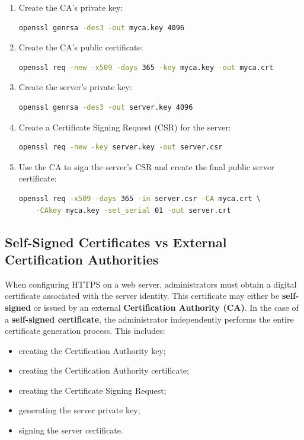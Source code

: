 \documentclass{scrbook}
\begin{document}
	\begin{enumerate}
		\item Create the CA's private key:
		\begin{lstlisting}[language=bash]
openssl genrsa -des3 -out myca.key 4096
		\end{lstlisting}
		
		\item Create the CA's public certificate:
		\begin{lstlisting}[language=bash]
openssl req -new -x509 -days 365 -key myca.key -out myca.crt
		\end{lstlisting}
		
		\item Create the server's private key:
		\begin{lstlisting}[language=bash]
openssl genrsa -des3 -out server.key 4096
		\end{lstlisting}
		
		\item Create a Certificate Signing Request (CSR) for the server:
		\begin{lstlisting}[language=bash]
openssl req -new -key server.key -out server.csr
		\end{lstlisting}
		
		\item Use the CA to sign the server's CSR and create the final public server certificate:
		\begin{lstlisting}[language=bash]
openssl req -x509 -days 365 -in server.csr -CA myca.crt \
	-CAkey myca.key -set_serial 01 -out server.crt
		\end{lstlisting}
	\end{enumerate}
	
	\newpage
	\subsection{Self-Signed Certificates vs External Certification Authorities}
	
	When configuring HTTPS on a web server, administrators must obtain a digital certificate associated with the server identity. This certificate may either be \textbf{self-signed} or issued by an external \textbf{Certification Authority (CA)}. In the case of a \textbf{self-signed certificate}, the administrator independently performs the entire certificate generation process. This includes:
	\begin{itemize}
		\item creating the Certification Authority key;
		\item creating the Certification Authority certificate;
		\item creating the Certificate Signing Request;
		\item generating the server private key;
		\item signing the server certificate.
	\end{itemize}
	
\end{document}
